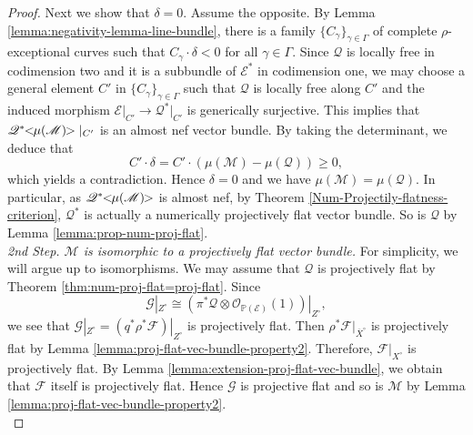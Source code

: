 \documentclass[english,reqno]{amsart}
\newcommand\bbP{{\mathbb P}}
\newcommand\sE{{\mathscr E}}
\newcommand\sF{{\mathscr F}}
\newcommand\sG{{\mathscr G}}
\newcommand\sM{{\mathscr M}}
\newcommand\sO{{\mathscr O}}
\newcommand\sQ{{\mathscr Q}}
\theoremstyle{plain}
\theoremstyle{definition}
\numberwithin{equation}{section} %
\begin{document}
\begin{proof}
	
	Next we  show that $\delta=0$. Assume the  opposite.
	By Lemma \ref{lemma:negativity-lemma-line-bundle},  there is a family $\{C_\gamma\}_{\gamma\in \Gamma}$ of complete $\rho$-exceptional curves  such that $C_\gamma\cdot \delta<0$ for all $\gamma\in \Gamma$.
	Since $\sQ$ is locally free in codimension two and  it is a subbundle of $\sE^*$ in codimension one,  we may choose a general element $C'$ in $\{C_\gamma\}_{\gamma\in \Gamma}$ such that $\sQ$ is locally free along $C'$ and the induced morphism $\sE\vert_{C'}\rightarrow \sQ^*\vert_{C'}$ is generically surjective.
	This implies that   $\sQ^*\hspace{-0.8ex}<\hspace{-0.8ex}\mu(\sM)\hspace{-0.8ex}>\vert_{C'}$ is an almost nef vector bundle. By taking the determinant, we deduce that 
	$$
	C'\cdot \delta=C'\cdot (\mu(\sM) - \mu(\sQ))\geqslant 0,
	$$ 
	which yields a contradiction. Hence $\delta=0$ and we have $\mu(\sM)=\mu(\sQ)$.
	In particular, as $\sQ^*\hspace{-0.8ex}<\hspace{-0.8ex}\mu(\sM)\hspace{-0.8ex}>$ is almost nef, by Theorem \ref{Num-Projectily-flatness-criterion}, $\sQ^*$ is actually a numerically projectively flat vector bundle. So is $\sQ$ by Lemma \ref{lemma:prop-num-proj-flat}.\\
	
	\textit{2nd Step. $\sM$ is isomorphic to a projectively flat vector bundle.} For simplicity, we  will argue up to isomorphisms. We may assume that $\sQ$ is projectively flat by Theorem \ref{thm:num-proj-flat=proj-flat}.
	Since $$\sG|_{Z^\circ} \cong (\pi^*\sQ \otimes \sO_{\bbP(\sE)}(1))|_{Z^\circ},$$ we see that $\sG|_{Z^\circ}=(q^*\rho^*\sF)|_{Z^\circ}$ is projectively flat. Then $\rho^*\sF|_{\overline{X}^\circ}$ is projectively flat by Lemma \ref{lemma:proj-flat-vec-bundle-property2}. Therefore, $\sF|_{X^\circ}$ is projectively flat. By Lemma \ref{lemma:extension-proj-flat-vec-bundle}, we obtain that $\sF$ itself is projectively flat. Hence $\sG$ is projective flat and so is   $\sM$ by Lemma \ref{lemma:proj-flat-vec-bundle-property2}.\\
	

\end{proof}
\end{document}
